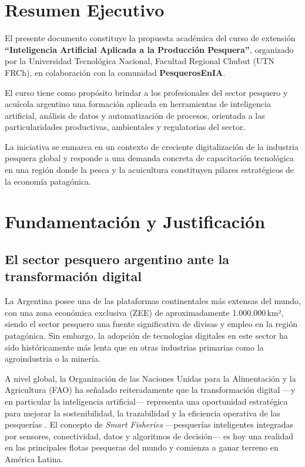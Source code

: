 \documentclass[12pt,a4paper]{article}
\begin{document}
\tableofcontents
\newpage

\section{Resumen Ejecutivo}

El presente documento constituye la propuesta académica del curso de extensión \textbf{``Inteligencia Artificial Aplicada a la Producción Pesquera''}, organizado por la Universidad Tecnológica Nacional, Facultad Regional Chubut (UTN FRCh), en colaboración con la comunidad \textbf{PesquerosEnIA}.

El curso tiene como propósito brindar a los profesionales del sector pesquero y acuícola argentino una formación aplicada en herramientas de inteligencia artificial, análisis de datos y automatización de procesos, orientada a las particularidades productivas, ambientales y regulatorias del sector.

La iniciativa se enmarca en un contexto de creciente digitalización de la industria pesquera global y responde a una demanda concreta de capacitación tecnológica en una región donde la pesca y la acuicultura constituyen pilares estratégicos de la economía patagónica.

\section{Fundamentación y Justificación}

\subsection{El sector pesquero argentino ante la transformación digital}

La Argentina posee una de las plataformas continentales más extensas del mundo, con una zona económica exclusiva (ZEE) de aproximadamente 1.000.000\,km², siendo el sector pesquero una fuente significativa de divisas y empleo en la región patagónica. Sin embargo, la adopción de tecnologías digitales en este sector ha sido históricamente más lenta que en otras industrias primarias como la agroindustria o la minería.

A nivel global, la Organización de las Naciones Unidas para la Alimentación y la Agricultura (FAO) ha señalado reiteradamente que la transformación digital ---y en particular la inteligencia artificial--- representa una oportunidad estratégica para mejorar la sostenibilidad, la trazabilidad y la eficiencia operativa de las pesquerías \parencite{FAO2022, FAO2024}. El concepto de \textit{Smart Fisheries} ---pesquerías inteligentes integradas por sensores, conectividad, datos y algoritmos de decisión--- es hoy una realidad en las principales flotas pesqueras del mundo y comienza a ganar terreno en América Latina.
\end{document}
